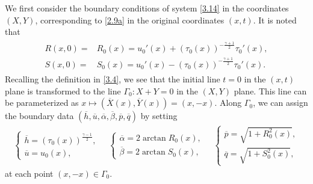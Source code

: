 \documentclass[11pt,reqno]{article}
\newcommand{\dps}{\displaystyle}
\newcommand{\fr}{\frac}
\numberwithin{equation}{section}
\begin{document}
We first consider the boundary conditions of system \eqref{3.14} in the
coordinates $(X,Y)$, corresponding to \eqref{2.9a} in the original coordinates $(x,t)$.
It is noted that
\begin{align}\label{3.18}
\begin{split}
R(x,0)=&R_0(x)=u_{0}'(x)+(\tau_0(x))^{-\fr{\gamma+1}{2}}\tau_{0}'(x), \\
S(x,0)=&S_0(x)=u_{0}'(x)-(\tau_0(x))^{-\fr{\gamma+1}{2}}\tau_{0}'(x).
\end{split}
\end{align}
Recalling the definition in \eqref{3.4}, we see that the initial line $t=0$ in the $(x,t)$ plane is transformed to the line $\Gamma_0: X+Y=0$ in the $(X,Y)$ plane. This line can be parameterized as $x\mapsto (\overline{X}(x), \overline{Y}(x))=(x,-x)$. Along $\Gamma_0$, we can assign the boundary data $(\overline{h}, \overline{u}, \overline{\alpha}, \overline{\beta}, \overline{p}, \overline{q})$ by setting
\begin{align}\label{3.19}
\left\{
\begin{array}{l}
\dps \overline{h}=(\tau_0(x))^{\fr{\gamma-1}{2}}, \\
\dps \overline{u}=u_0(x),
\end{array}
\right.
\quad
\left\{
\begin{array}{l}
\dps \overline{\alpha}=2\arctan R_0(x), \\
\dps \overline{\beta}=2\arctan S_0(x),
\end{array}
\right.
\quad
\left\{
\begin{array}{l}
\dps \overline{p}=\sqrt{1+R_{0}^2(x)}, \\
\dps \overline{q}=\sqrt{1+S_{0}^2(x)},
\end{array}
\right.
\end{align}
at each point $(x,-x)\in\Gamma_0$.
\end{document}
